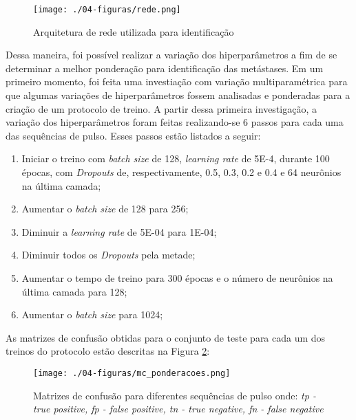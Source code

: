 \begin{figure}[!htb]
\centering
	\texttt{[image: ./04-figuras/rede.png]}
	\caption{Arquitetura de rede utilizada para identificação}\vspace{-0.2cm}
    \label{fig:rede}
\end{figure}

Dessa maneira, foi possível realizar a variação dos hiperparâmetros a fim de se determinar a melhor ponderação para identificação das metástases. Em um primeiro momento, foi feita uma investiação com variação multiparamétrica para que algumas variações de hiperparâmetros fossem analisadas e ponderadas para a criação de um protocolo de treino. A partir dessa primeira investigação, a variação dos hiperparâmetros foram feitas realizando-se 6 passos para cada uma das sequências de pulso. Esses passos estão listados a seguir:

\begin{enumerate}
    \item Iniciar o treino com \textit{batch size} de 128, \textit{learning rate} de 5E-4, durante 100 épocas, com \textit{Dropouts} de, respectivamente, 0.5, 0.3, 0.2 e 0.4 e 64 neurônios na última camada;
    \item Aumentar o \textit{batch size} de 128 para 256;
    \item Diminuir a \textit{learning rate} de 5E-04 para  1E-04;
    \item Diminuir todos os \textit{Dropouts} pela metade;
    \item Aumentar o tempo de treino para 300 épocas e o número de neurônios na última camada para 128;
    \item Aumentar o \textit{batch size} para 1024;
\end{enumerate}

As matrizes de confusão obtidas para o conjunto de teste para cada um dos treinos do protocolo estão descritas na Figura \ref{fig:mc_ponderacoes}:

\begin{figure}[!htb]
\centering
	\texttt{[image: ./04-figuras/mc\_ponderacoes.png]}
	\caption{Matrizes de confusão para diferentes sequências de pulso onde: \textit{tp - true positive, fp - false positive, tn - true negative, fn - false negative}}\vspace{-0.2cm}
    \label{fig:mc_ponderacoes}
\end{figure}

